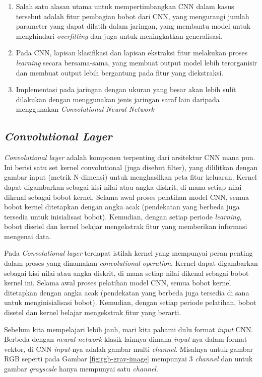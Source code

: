 \begin{enumerate}
	\item Salah satu alasan utama untuk mempertimbangkan CNN dalam kasus tersebut adalah fitur pembagian bobot dari CNN, yang mengurangi jumlah parameter yang dapat dilatih dalam jaringan, yang membantu model untuk menghindari \textit{overfitting} dan juga untuk meningkatkan generalisasi.
	\item Pada CNN, lapisan klasifikasi dan lapisan ekstraksi fitur melakukan proses \textit{learning} secara bersama-sama, yang membuat output model lebih terorganisir dan membuat output lebih bergantung pada fitur yang diekstraksi.
	\item Implementasi pada jaringan dengan ukuran yang besar akan lebih sulit dilakukan dengan menggunakan jenis jaringan saraf lain daripada menggunakan \textit{Convolutional Neural Network}
\end{enumerate}

\subsection{\textit{Convolutional Layer}}
\label{subsec:convolutional-layer}

\textit{Convolutional layer} adalah komponen terpenting dari arsitektur CNN mana pun. Ini berisi satu set kernel convolutional (juga disebut filter), yang dililitkan dengan gambar input (metrik N-dimensi) untuk menghasilkan peta fitur keluaran. Kernel dapat digambarkan sebagai kisi nilai atau angka diskrit, di mana setiap nilai dikenal sebagai bobot kernel. Selama awal proses pelatihan model CNN, semua bobot kernel ditetapkan dengan angka acak (pendekatan yang berbeda juga tersedia untuk inisialisasi bobot). Kemudian, dengan setiap periode \textit{learning}, bobot disetel dan kernel belajar mengekstrak fitur yang memberikan informasi mengenai data.

Pada \textit{Convolutional layer} terdapat istilah kernel yang mempunyai peran penting dalam proses yang dinamakan \textit{convolutional operation}. Kernel dapat digambarkan sebagai kisi nilai atau angka diskrit, di mana setiap nilai dikenal sebagai bobot kernel ini. Selama awal proses pelatihan model CNN, semua bobot kernel ditetapkan dengan angka acak (pendekatan yang berbeda juga tersedia di sana untuk menginisialisasi bobot). Kemudian, dengan setiap periode pelatihan, bobot disetel dan kernel belajar mengekstrak fitur yang berarti.

Sebelum kita mempelajari lebih jauh, mari kita pahami dulu format \textit{input} CNN. Berbeda dengan \textit{neural network} klasik lainnya dimana \textit{input}-nya dalam format vektor, di CNN \textit{input}-nya adalah gambar multi \textit{channel}. Misalnya untuk gambar RGB seperti pada Gambar \ref{fig:rgb-gray-image} mempunyai 3 \textit{channel} dan untuk gambar \textit{grayscale} hanya mempunyai satu \textit{channel}.

